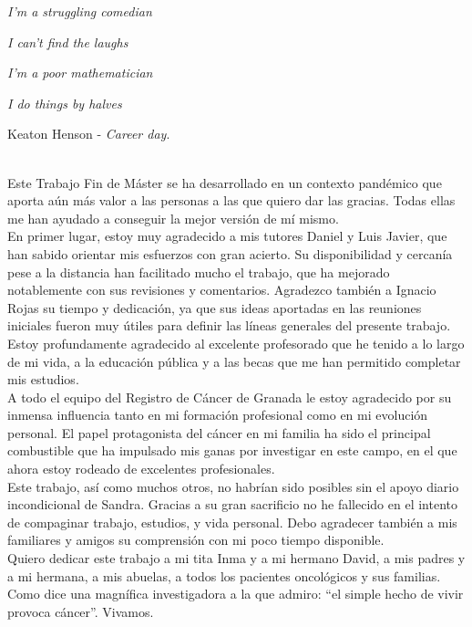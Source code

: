 \null\newpage
\thispagestyle{empty}

\small{	 
	\textit{I'm a struggling comedian}
	
	\textit{I can't find the laughs}
	
	\textit{I'm a poor mathematician }
	
	\textit{I do things by halves}
	
	Keaton Henson - \textit{Career day}.
}

\vspace{1.4cm}

\\

Este Trabajo Fin de Máster se ha desarrollado en un contexto pandémico que aporta aún más valor a las personas a las que quiero dar las gracias. Todas ellas me han ayudado a conseguir la mejor versión de mí mismo.\\

En primer lugar, estoy muy agradecido a mis tutores Daniel y Luis Javier, que han sabido orientar mis esfuerzos con gran acierto. Su disponibilidad y cercanía pese a la distancia han facilitado mucho el trabajo, que ha mejorado notablemente con sus revisiones y comentarios. Agradezco también a Ignacio Rojas su tiempo y dedicación, ya que sus ideas aportadas en las reuniones iniciales fueron muy útiles para definir las líneas generales del presente trabajo. 
\\

Estoy profundamente agradecido al excelente profesorado que he tenido a lo largo de mi vida, a la educación pública y a las becas que me han permitido completar mis estudios.
\\

A todo el equipo del Registro de Cáncer de Granada le estoy agradecido por su inmensa influencia tanto en mi formación profesional como en mi evolución personal. El papel protagonista del cáncer en mi familia ha sido el principal combustible que ha impulsado mis ganas por investigar en este campo, en el que ahora estoy rodeado de excelentes profesionales.
\\

Este trabajo, así como muchos otros, no habrían sido posibles sin el apoyo diario incondicional de Sandra. Gracias a su gran sacrificio no he fallecido en el intento de compaginar trabajo, estudios, y vida personal. Debo agradecer también a mis familiares y amigos su comprensión con mi poco tiempo disponible.
\\

Quiero dedicar este trabajo a mi tita Inma y a mi hermano David, a mis padres y a mi hermana, a mis abuelas, a todos los pacientes oncológicos y sus familias. Como dice una magnífica investigadora a la que admiro: “el simple hecho de vivir provoca cáncer”. Vivamos. 

	\thispagestyle{empty}